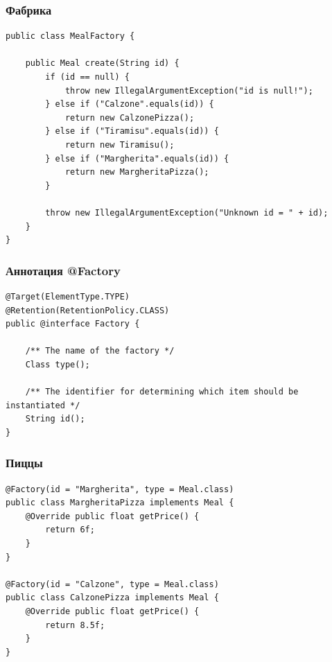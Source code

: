 \documentclass[xetex,mathserif,serif]{beamer}
\begin{document}
	\begin{frame}[fragile]
		\frametitle{Фабрика}
		\begin{small}
			\begin{verbatim}
public class MealFactory {

    public Meal create(String id) {
        if (id == null) {
            throw new IllegalArgumentException("id is null!");
        } else if ("Calzone".equals(id)) {
            return new CalzonePizza();
        } else if ("Tiramisu".equals(id)) {
            return new Tiramisu();
        } else if ("Margherita".equals(id)) {
            return new MargheritaPizza();
        }

        throw new IllegalArgumentException("Unknown id = " + id);
    }
}
			\end{verbatim}
		\end{small}
	\end{frame}

	\begin{frame}[fragile]
		\frametitle{Аннотация @Factory}
		\begin{small}
			\begin{verbatim}
@Target(ElementType.TYPE) 
@Retention(RetentionPolicy.CLASS)
public @interface Factory {

    /** The name of the factory */
    Class type();

    /** The identifier for determining which item should be instantiated */
    String id();
}
			\end{verbatim}
		\end{small}
	\end{frame}

	\begin{frame}[fragile]
		\frametitle{Пиццы}
		\begin{small}
			\begin{verbatim}
@Factory(id = "Margherita", type = Meal.class)
public class MargheritaPizza implements Meal {
    @Override public float getPrice() {
        return 6f;
    }
}

@Factory(id = "Calzone", type = Meal.class)
public class CalzonePizza implements Meal {
    @Override public float getPrice() {
        return 8.5f;
    }
}
			\end{verbatim}
		\end{small}
	\end{frame}
\end{document}
